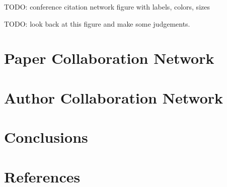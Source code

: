 \documentclass{article}
\renewcommand{\figure}[1]{\vspace{1em}\noindent#1\vspace{1em}}
\begin{document}
\figure{TODO: conference citation network figure with labels, colors, sizes}

TODO: look back at this figure and make some judgements.

\section{Paper Collaboration Network}

\section{Author Collaboration Network}


\section{Conclusions}


\section{References}
\end{document}
